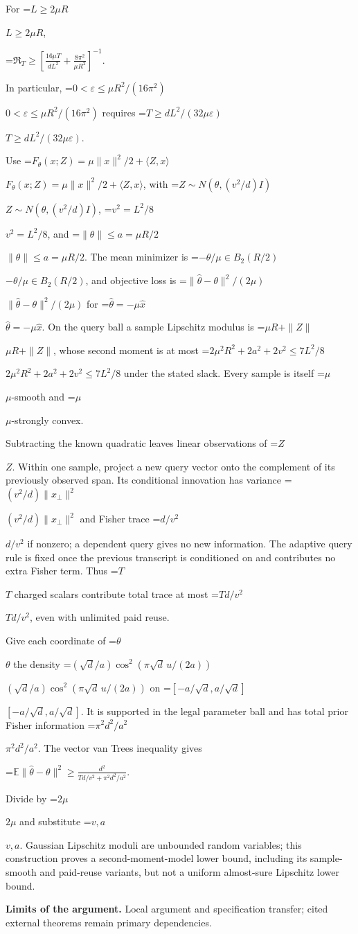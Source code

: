 \documentclass[10pt,a4paper]{article}
\newcommand{\AtlasMath}[1]{\par\begingroup\centering\setbox0=\hbox{$\displaystyle #1$}\ifdim\wd0>1.4\linewidth\typeout{ATLAS WIDE FORMULA: \the\wd0}\fi\ifdim\wd0>\linewidth\resizebox{\linewidth}{!}{\box0}\else\box0\fi\par\endgroup}
\newcommand{\AtlasInlineMath}[1]{\begingroup\setbox0=\hbox{$#1$}\ifdim\wd0>.4\linewidth\endgroup\AtlasMath{#1}\else\endgroup$#1$\fi}
\begin{document}
For \AtlasInlineMath{L\ge2\mu R},

\AtlasMath{\mathfrak R_T\ge\left[\frac{16\mu T}{dL^2}+\frac{8\pi^2}{\mu R^2}\right]^{-1}.}

In particular, \AtlasInlineMath{0<\varepsilon\le\mu R^2/(16\pi^2)} requires \AtlasInlineMath{T\ge dL^2/(32\mu\varepsilon)}.

Use \AtlasInlineMath{F_\theta(x;Z)=\mu\|x\|^2/2+\langle Z,x\rangle}, with \AtlasInlineMath{Z\sim N(\theta,(v^2/d)I)}, \AtlasInlineMath{v^2=L^2/8}, and \AtlasInlineMath{\|\theta\|\le a=\mu R/2}. The mean minimizer is \AtlasInlineMath{-\theta/\mu\in B_2(R/2)}, and objective loss is \AtlasInlineMath{\|\widehat\theta-\theta\|^2/(2\mu)} for \AtlasInlineMath{\widehat\theta=-\mu\widehat x}. On the query ball a sample Lipschitz modulus is \AtlasInlineMath{\mu R+\|Z\|}, whose second moment is at most \AtlasInlineMath{2\mu^2R^2+2a^2+2v^2\le7L^2/8} under the stated slack. Every sample is itself \AtlasInlineMath{\mu}-smooth and \AtlasInlineMath{\mu}-strongly convex.

Subtracting the known quadratic leaves linear observations of \AtlasInlineMath{Z}. Within one sample, project a new query vector onto the complement of its previously observed span. Its conditional innovation has variance \AtlasInlineMath{(v^2/d)\|x_\perp\|^2} and Fisher trace \AtlasInlineMath{d/v^2} if nonzero; a dependent query gives no new information. The adaptive query rule is fixed once the previous transcript is conditioned on and contributes no extra Fisher term. Thus \AtlasInlineMath{T} charged scalars contribute total trace at most \AtlasInlineMath{Td/v^2}, even with unlimited paid reuse.

Give each coordinate of \AtlasInlineMath{\theta} the density \AtlasInlineMath{(\sqrt d/a)\cos^2(\pi\sqrt d\,u/(2a))} on \AtlasInlineMath{[-a/\sqrt d,a/\sqrt d]}. It is supported in the legal parameter ball and has total prior Fisher information \AtlasInlineMath{\pi^2d^2/a^2}. The vector van Trees inequality gives

\AtlasMath{\mathbb E\|\widehat\theta-\theta\|^2\ge\frac{d^2}{Td/v^2+\pi^2d^2/a^2}.}

Divide by \AtlasInlineMath{2\mu} and substitute \AtlasInlineMath{v,a}. Gaussian Lipschitz moduli are unbounded random variables; this construction proves a second-moment-model lower bound, including its sample-smooth and paid-reuse variants, but not a uniform almost-sure Lipschitz lower bound.

\textbf{Limits of the argument.} Local argument and specification transfer; cited external theorems remain primary dependencies.
\end{document}
